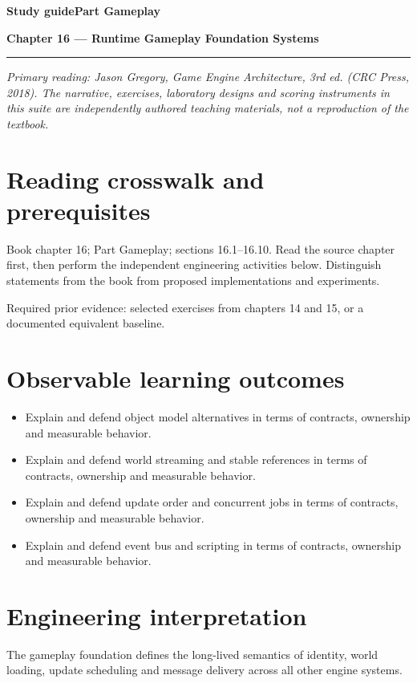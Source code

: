 \documentclass[11pt,letterpaper]{article}
\newcommand{\DocType}{Reference}
\newcommand{\SuiteHeading}[3]{%
\renewcommand{\DocType}{#2}%
{\small\bfseries\sffamily\color{EngineTeal}#2\hfill #3}\par\vspace{6pt}
{\LARGE\bfseries\color{EngineBlue}#1}\par\vspace{4pt}
{\color{EngineTeal}\rule{\linewidth}{1pt}}\par\vspace{7pt}}
\newcommand{\SourceNote}{\footnotesize\textit{Primary reading: Jason Gregory, \emph{Game Engine Architecture}, 3rd ed. (CRC Press, 2018). The narrative, exercises, laboratory designs and scoring instruments in this suite are independently authored teaching materials, not a reproduction of the textbook.}\normalsize\par}
\begin{document}
\SuiteHeading{Chapter 16 — Runtime Gameplay Foundation Systems}{Study guide}{Part Gameplay}
\SourceNote
\section{Reading crosswalk and prerequisites}
Book chapter 16; Part Gameplay; sections 16.1--16.10. Read the source chapter first, then perform the independent engineering activities below. Distinguish statements from the book from proposed implementations and experiments.

Required prior evidence: selected exercises from chapters 14 and 15, or a documented equivalent baseline.

\section{Observable learning outcomes}
\begin{itemize}
\item Explain and defend object model alternatives in terms of contracts, ownership and measurable behavior.
\item Explain and defend world streaming and stable references in terms of contracts, ownership and measurable behavior.
\item Explain and defend update order and concurrent jobs in terms of contracts, ownership and measurable behavior.
\item Explain and defend event bus and scripting in terms of contracts, ownership and measurable behavior.
\end{itemize}
\section{Engineering interpretation}
The gameplay foundation defines the long-lived semantics of identity, world loading, update scheduling and message delivery across all other engine systems.
\end{document}
